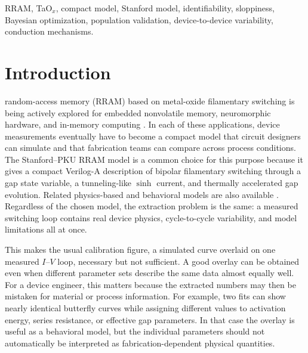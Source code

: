 \documentclass[journal]{IEEEtran}
\begin{document}
\begin{IEEEkeywords}
RRAM, TaO$_x$, compact model, Stanford model, identifiability, sloppiness,
Bayesian optimization, population validation, device-to-device variability,
conduction mechanisms.
\end{IEEEkeywords}

\IEEEpeerreviewmaketitle

\section{Introduction}

 random-access memory (RRAM) based on metal-oxide
filamentary switching is being actively explored for embedded nonvolatile
memory, neuromorphic hardware, and in-memory computing
\cite{wong2012metal,ielmini2018inmemory,yu2018neuro}.  In each of these
applications, device measurements eventually have to become a compact model
that circuit designers can simulate and that fabrication teams can compare
across process conditions.  The Stanford--PKU RRAM model
\cite{guan2012spice,jiang2016verification} is a common choice for this
purpose because it gives a compact Verilog-A description of bipolar
filamentary switching through a gap state variable, a tunneling-like
$\sinh$ current, and thermally accelerated gap evolution.  Related
physics-based and behavioral models are also available
\cite{bocquet2014,bengel2020jart,kvatinsky2015vteam}.  Regardless of the
chosen model, the extraction problem is the same: a measured switching loop
contains real device physics, cycle-to-cycle variability, and model
limitations all at once.

This makes the usual calibration figure, a simulated curve overlaid on one
measured $I$--$V$ loop, necessary but not sufficient.  A good overlay can be
obtained even when different parameter sets describe the same data almost
equally well.  For a device engineer, this matters because the extracted
numbers may then be mistaken for material or process information.  For
example, two fits can show nearly identical butterfly curves while assigning
different values to activation energy, series resistance, or effective gap
parameters.  In that case the overlay is useful as a behavioral model, but
the individual parameters should not automatically be interpreted as
fabrication-dependent physical quantities.
\end{document}
